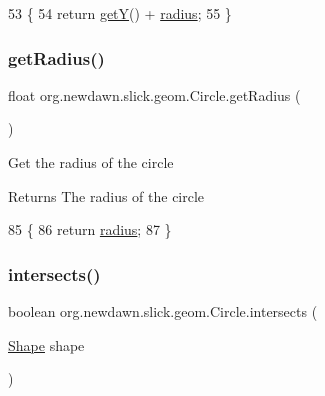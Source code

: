 \begin{DoxyCode}
53                               \{
54         \textcolor{keywordflow}{return} \mbox{\hyperlink{classorg_1_1newdawn_1_1slick_1_1geom_1_1_shape_a5f334f962d8fc525d522fe0f8ac20b35}{getY}}() + \mbox{\hyperlink{classorg_1_1newdawn_1_1slick_1_1geom_1_1_circle_a4ca88ec1c6b329912a60e4dd02ccdf5a}{radius}};
55     \}
\end{DoxyCode}
\mbox{\label{classorg_1_1newdawn_1_1slick_1_1geom_1_1_circle_a3d83f7477c608a767ced2622440a528a}} 
\subsubsection{\texorpdfstring{get\+Radius()}{getRadius()}}
{\footnotesize\ttfamily float org.\+newdawn.\+slick.\+geom.\+Circle.\+get\+Radius (\begin{DoxyParamCaption}{ }\end{DoxyParamCaption})\hspace{0.3cm}{\ttfamily [inline]}}

Get the radius of the circle

\begin{DoxyReturn}{Returns}
The radius of the circle 
\end{DoxyReturn}

\begin{DoxyCode}
85                              \{
86         \textcolor{keywordflow}{return} \mbox{\hyperlink{classorg_1_1newdawn_1_1slick_1_1geom_1_1_circle_a4ca88ec1c6b329912a60e4dd02ccdf5a}{radius}};
87     \}
\end{DoxyCode}
\mbox{\label{classorg_1_1newdawn_1_1slick_1_1geom_1_1_circle_a43871352a37b105ea470981d89a178cc}} 
\subsubsection{\texorpdfstring{intersects()}{intersects()}\hspace{0.1cm}{\footnotesize\ttfamily [1/3]}}
{\footnotesize\ttfamily boolean org.\+newdawn.\+slick.\+geom.\+Circle.\+intersects (\begin{DoxyParamCaption}\item[{\mbox{\hyperlink{classorg_1_1newdawn_1_1slick_1_1geom_1_1_shape}{Shape}}}]{shape }\end{DoxyParamCaption})\hspace{0.3cm}{\ttfamily [inline]}}

